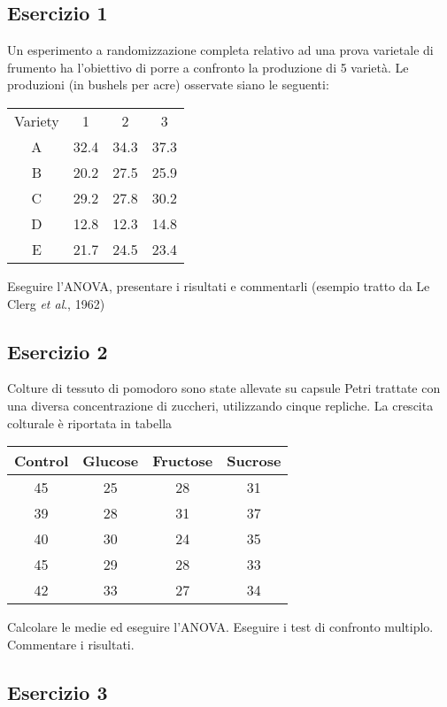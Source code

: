 \documentclass[a4paper,12pt,oneside]{book}
\begin{document}
\hypertarget{esercizio-1-5}{%
\subsection{Esercizio 1}\label{esercizio-1-5}}

Un esperimento a randomizzazione completa relativo ad una prova varietale di frumento ha l'obiettivo di porre a confronto la produzione di 5 varietà. Le produzioni (in bushels per acre) osservate siano le seguenti:

\begin{longtable}[]{@{}cccc@{}}
\toprule
& & & \\
\midrule
\endhead
Variety & 1 & 2 & 3 \\
A & 32.4 & 34.3 & 37.3 \\
B & 20.2 & 27.5 & 25.9 \\
C & 29.2 & 27.8 & 30.2 \\
D & 12.8 & 12.3 & 14.8 \\
E & 21.7 & 24.5 & 23.4 \\
\bottomrule
\end{longtable}

Eseguire l'ANOVA, presentare i risultati e commentarli (esempio tratto da Le Clerg \emph{et al}., 1962)

\hypertarget{esercizio-2-4}{%
\subsection{Esercizio 2}\label{esercizio-2-4}}

Colture di tessuto di pomodoro sono state allevate su capsule Petri trattate con una diversa concentrazione di zuccheri, utilizzando cinque repliche. La crescita colturale è riportata in tabella

\begin{longtable}[]{@{}cccc@{}}
\toprule
Control & Glucose & Fructose & Sucrose \\
\midrule
\endhead
45 & 25 & 28 & 31 \\
39 & 28 & 31 & 37 \\
40 & 30 & 24 & 35 \\
45 & 29 & 28 & 33 \\
42 & 33 & 27 & 34 \\
\bottomrule
\end{longtable}

Calcolare le medie ed eseguire l'ANOVA. Eseguire i test di confronto multiplo. Commentare i risultati.

\hypertarget{esercizio-3-4}{%
\subsection{Esercizio 3}\label{esercizio-3-4}}
\end{document}
